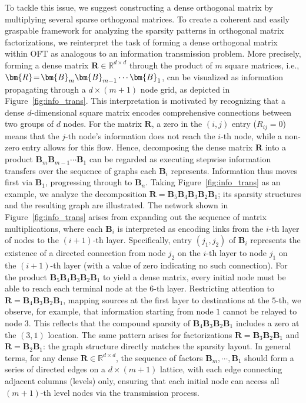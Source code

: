 To tackle this issue, we suggest constructing a dense orthogonal matrix by multiplying several sparse orthogonal matrices. To create a coherent and easily graspable framework for analyzing the sparsity patterns in orthogonal matrix factorizations, we reinterpret the task of forming a dense orthogonal matrix within OFT as analogous to an information transmission problem. More precisely, forming a dense matrix $\bm{R}\in\mathbb{R}^{d\times d}$ through the product of $m$ square matrices, i.e., $\thickmuskip=2mu \medmuskip=2mu \bm{R}=\bm{B}_m\bm{B}_{m-1}\cdots\bm{B}_1$, can be visualized as information propagating through a $d\times (m+1)$ node grid, as depicted in Figure~\ref{fig:info_trans}. This interpretation is motivated by recognizing that a dense $d$-dimensional square matrix encodes comprehensive connections between two groups of $d$ nodes. For the matrix $\bm{R}$, a zero in the $(i,j)$ entry ($R_{ij}=0$) means that the $j$-th node’s information does not reach the $i$-th node, while a non-zero entry allows for this flow. Hence, decomposing the dense matrix $\bm{R}$ into a product $\bm{B}_m\bm{B}_{m-1}\cdots\bm{B}_1$ can be regarded as executing stepwise information transfers over the sequence of graphs each $\bm{B}_i$ represents. Information thus moves first via $\bm{B}_1$, progressing through to $\bm{B}_n$. Taking Figure~\ref{fig:info_trans} as an example, we analyze the decomposition $\bm{R}=\bm{B}_5\bm{B}_4\bm{B}_3\bm{B}_2\bm{B}_1$; its sparsity structures and the resulting graph are illustrated. The network shown in Figure~\ref{fig:info_trans} arises from expanding out the sequence of matrix multiplications, where each $\bm{B}_i$ is interpreted as encoding links from the $i$-th layer of nodes to the $(i+1)$-th layer. Specifically, entry $(j_1, j_2)$ of $\bm{B}_i$ represents the existence of a directed connection from node $j_2$ on the $i$-th layer to node $j_1$ on the $(i+1)$-th layer (with a value of zero indicating no such connection). For the product $\bm{B}_5\bm{B}_4\bm{B}_3\bm{B}_2\bm{B}_1$ to yield a dense matrix, every initial node must be able to reach each terminal node at the $6$-th layer. Restricting attention to $\bm{R}=\bm{B}_4\bm{B}_3\bm{B}_2\bm{B}_1$, mapping sources at the first layer to destinations at the $5$-th, we observe, for example, that information starting from node $1$ cannot be relayed to node $3$. This reflects that the compound sparsity of $\bm{B}_4\bm{B}_3\bm{B}_2\bm{B}_1$ includes a zero at the $(3,1)$ location. The same pattern arises for factorizations $\bm{R}=\bm{B}_3\bm{B}_2\bm{B}_1$ and $\bm{R}=\bm{B}_2\bm{B}_1$: the graph structure directly matches the sparsity layout. In general terms, for any dense $\bm{R}\in\mathbb{R}^{d\times d}$, the sequence of factors $\bm{B}_m,\cdots,\bm{B}_1$ should form a series of directed edges on a $d\times (m+1)$ lattice, with each edge connecting adjacent columns (levels) only, ensuring that each initial node can access all $(m+1)$-th level nodes via the transmission process.

